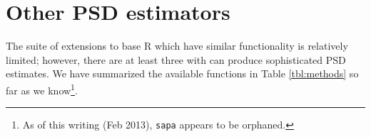 \documentclass[12pt]{article}\usepackage{graphicx, color}
\newcommand{\Rcmd}[1]{\texttt{#1}}
\begin{document}
\section{Other PSD estimators}
The suite of extensions to base R which have
similar functionality
is relatively limited; however, there are at least three with
can produce sophisticated PSD estimates.   We have
summarized the available functions in Table \ref{tbl:methods}
so far as we know\footnote{
As of this writing (Feb 2013), \Rcmd{sapa} appears to be orphaned.
}.






\printindex
\end{document}
